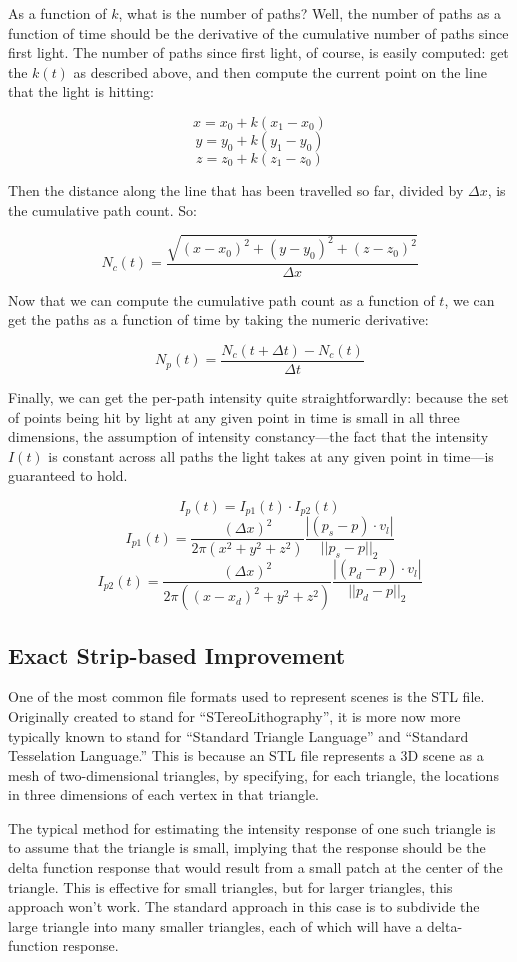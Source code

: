 \documentclass[11pt]{article}
\begin{document}
As a function of $k$, what is the number of paths? Well, the number of paths as a function of time should be the derivative of the cumulative number of paths since first light. The number of paths since first light, of course, is easily computed: get the $k(t)$ as described above, and then compute the current point on the line that the light is hitting:

$$x = x_0 + k(x_1 - x_0)$$
$$y = y_0 + k(y_1 - y_0)$$
$$z = z_0 + k(z_1 - z_0)$$

Then the distance along the line that has been travelled so far, divided by $\Delta x$, is the cumulative path count. So:

$$N_c(t) = \frac{\sqrt{(x-x_0)^2 + (y-y_0)^2 + (z-z_0)^2}}{\Delta x}$$

Now that we can compute the cumulative path count as a function of $t$, we can get the paths as a function of time by taking the numeric derivative:

$$N_p(t) = \frac{N_c(t + \Delta t) - N_c(t)}{\Delta t}$$

Finally, we can get the per-path intensity quite straightforwardly: because the set of points being hit by light at any given point in time is small in all three dimensions, the assumption of intensity constancy---the fact that the intensity $I(t)$ is constant across all paths the light takes at any given point in time---is guaranteed to hold. 

$$I_p(t) = I_{p1}(t) \cdot I_{p2}(t)$$
$$I_{p1}(t) = \frac{(\Delta x)^2}{2\pi(x^2+y^2+z^2)} \frac{|(p_s - p) \cdot v_l|}{||p_s - p||_2}$$
$$I_{p2}(t) = \frac{(\Delta x)^2}{2\pi((x-x_d)^2+y^2+z^2)} \frac{|(p_d - p) \cdot v_l|}{||p_d - p||_2}$$

\subsection{Exact Strip-based Improvement}

One of the most common file formats used to represent scenes is the STL file. Originally created to stand for ``STereoLithography'', it is more now more typically known to stand for ``Standard Triangle Language'' and ``Standard Tesselation Language.'' This is because an STL file represents a 3D scene as a mesh of two-dimensional triangles, by specifying, for each triangle, the locations in three dimensions of each vertex in that triangle.

The typical method for estimating the intensity response of one such triangle is to assume that the triangle is small, implying that the response should be the delta function response that would result from a small patch at the center of the triangle. This is effective for small triangles, but for larger triangles, this approach won't work. The standard approach in this case is to subdivide the large triangle into many smaller triangles, each of which will have a delta-function response.
\end{document}
